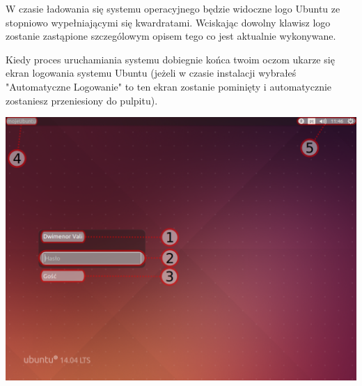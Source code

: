 W czasie ładowania się systemu operacyjnego będzie widoczne logo Ubuntu ze stopniowo wypełniającymi się kwardratami. Wciskając dowolny klawisz logo zostanie zastąpione szczególowym opisem tego co jest aktualnie wykonywane.

Kiedy proces uruchamiania systemu dobiegnie końca twoim oczom ukarze się ekran logowania systemu Ubuntu (jeżeli w czasie instalacji wybrałeś "Automatyczne Logowanie" to ten ekran zostanie pominięty i automatycznie zostaniesz przeniesiony do pulpitu).
\begin{center}
	\includegraphics[scale=0.5]{images/greater.png}
\end{center}

